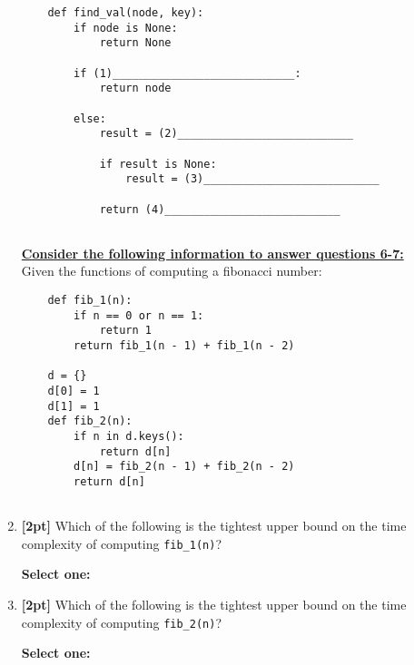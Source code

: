 \documentclass[12pt]{article}
\renewcommand{\circle}{\tikz\draw[black] (0,0) circle (1ex);}
\begin{document}
\begin{enumerate}
\begin{lstlisting}
    def find_val(node, key):
        if node is None:
            return None
            
        if (1)____________________________:
            return node
            
        else:
            result = (2)___________________________
            
            if result is None:
                result = (3)___________________________
                
            return (4)___________________________
                
    \end{lstlisting}
    
    
    \newpage
    \textbf{\underline{Consider the following information to answer questions 6-7:}} \\
    Given the functions of computing a fibonacci number:
    \begin{lstlisting}
    def fib_1(n):
        if n == 0 or n == 1:
            return 1
        return fib_1(n - 1) + fib_1(n - 2)
        
    d = {}
    d[0] = 1
    d[1] = 1
    def fib_2(n):
        if n in d.keys():
            return d[n]
        d[n] = fib_2(n - 1) + fib_2(n - 2)
        return d[n]
        
    \end{lstlisting}
    
    \item \textbf{[2pt]} Which of the following is the tightest upper bound on the time complexity of computing \lstinline{fib_1(n)}? 

    \textbf{Select one:}

    
    \item \textbf{[2pt]} Which of the following is the tightest upper bound on the time complexity of computing \lstinline{fib_2(n)}? 

    \textbf{Select one:}

    \clearpage
\end{enumerate}
\end{document}
